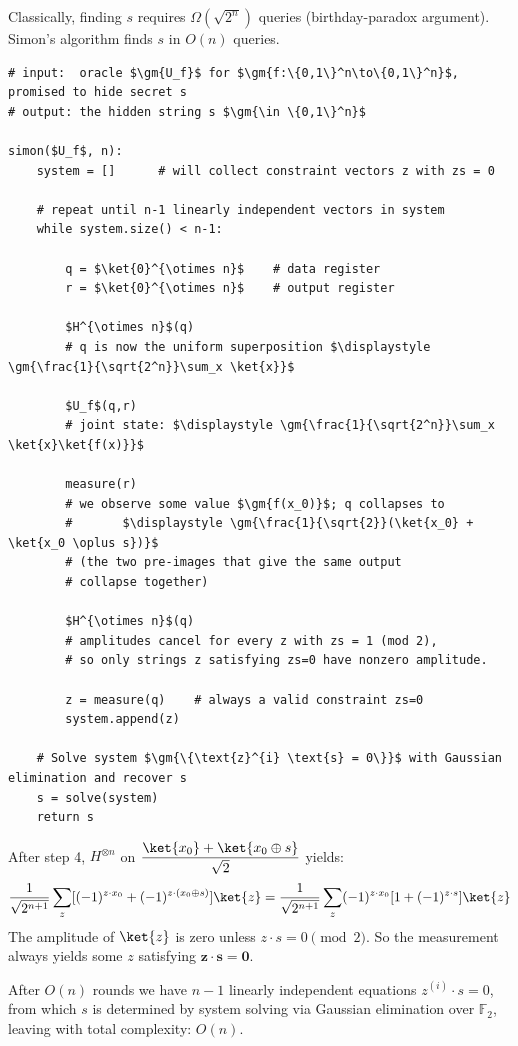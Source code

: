\documentclass[oneside]{academica}
\begin{document}
Classically, finding $s$ requires $\Omega(\sqrt{2^n})$ queries (birthday-paradox argument).
Simon's algorithm finds $s$ in $O(n)$ queries.

\begin{lstlisting}
# input:  oracle $\gm{U_f}$ for $\gm{f:\{0,1\}^n\to\{0,1\}^n}$, promised to hide secret s
# output: the hidden string s $\gm{\in \{0,1\}^n}$

simon($U_f$, n):
    system = []      # will collect constraint vectors z with zs = 0

    # repeat until n-1 linearly independent vectors in system
    while system.size() < n-1:

        q = $\ket{0}^{\otimes n}$    # data register
        r = $\ket{0}^{\otimes n}$    # output register

        $H^{\otimes n}$(q)
        # q is now the uniform superposition $\displaystyle \gm{\frac{1}{\sqrt{2^n}}\sum_x \ket{x}}$

        $U_f$(q,r)
        # joint state: $\displaystyle \gm{\frac{1}{\sqrt{2^n}}\sum_x \ket{x}\ket{f(x)}}$

        measure(r)
        # we observe some value $\gm{f(x_0)}$; q collapses to
        #       $\displaystyle \gm{\frac{1}{\sqrt{2}}(\ket{x_0} + \ket{x_0 \oplus s})}$
        # (the two pre-images that give the same output
        # collapse together)

        $H^{\otimes n}$(q)
        # amplitudes cancel for every z with zs = 1 (mod 2),
        # so only strings z satisfying zs=0 have nonzero amplitude.

        z = measure(q)    # always a valid constraint zs=0
        system.append(z)

    # Solve system $\gm{\{\text{z}^{i} \text{s} = 0\}}$ with Gaussian elimination and recover s
    s = solve(system)
    return s
\end{lstlisting}

After step 4, $H^{\otimes n}$ on $\displaystyle\frac{\ket{x_0}+\ket{x_0\oplus s}}{\sqrt{2}}$ yields:
\begin{equation*}
  \frac{1}{\sqrt{2^{n+1}}}\sum_z[(-1)^{z\cdot x_0}+(-1)^{z\cdot(x_0\oplus s)}]\ket{z}
  =\frac{1}{\sqrt{2^{n+1}}}\sum_z(-1)^{z\cdot x_0}[1+(-1)^{z\cdot s}]\ket{z}
\end{equation*}
The amplitude of $\ket{z}$ is zero unless $z\cdot s=0\pmod2$.
So the measurement always yields some $z$ satisfying $\mathbf{z\cdot s=0}$.

After $O(n)$ rounds we have $n-1$ linearly independent equations $z^{(i)}\cdot s=0$, from which $s$ is determined by system solving via Gaussian elimination over $\mathbb{F}_2$, leaving with total complexity: $O(n)$.
\end{document}
